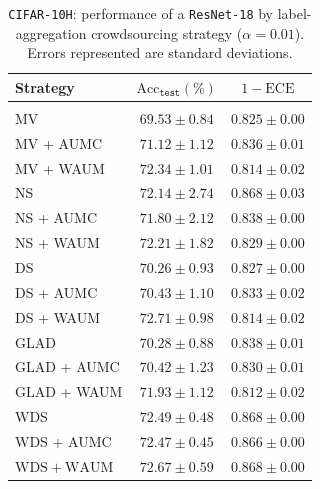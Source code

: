 \begin{table}[t]
    \label{tab:spam-0-expe}
    \begin{footnotesize}
        \begin{center}
            \begin{tabular}{lcc}
                Strategy & $\mathrm{Acc}_{\texttt{test}} (\%)$ & $1-\mathrm{ECE}$
                \\ \hline \\[-0.2cm]
                MV                 & $69.53\pm 0.84$               & $0.825\pm 0.00$                                 \\
                MV + AUMC & $71.12\pm 1.12$ & $\mathbf{0.836\pm 0.01}$ \\
                MV + WAUM & $\mathbf{72.34\pm 1.01}$ & $0.814\pm 0.02$ \\
                \rowcolor{gray!20}NS                 & $72.14\pm 2.74$               & $\mathbf{0.868\pm 0.03}$          \\
                \rowcolor{gray!20}NS + AUMC                 & $71.80\pm 2.12$               & $0.838\pm 0.00$          \\
                \rowcolor{gray!20}NS + WAUM                 & $\mathbf{72.21\pm 1.82}$               & $0.829\pm 0.00$          \\
                DS                 & $70.26\pm 0.93$               & $0.827\pm 0.00$             \\
                DS + AUMC                 & $70.43\pm 1.10$               & $\mathbf{0.833\pm 0.02}$             \\
                DS + WAUM                & $\mathbf{72.71\pm 0.98}$               & $0.814\pm 0.02$             \\
               \rowcolor{gray!20} $\mathrm{GLAD}$    & $70.28\pm 0.88$               & $\mathbf{0.838\pm 0.01}$\\
                \rowcolor{gray!20} $\mathrm{GLAD}$ + AUMC    & $70.42\pm 1.23$               & $0.830\pm 0.01$\\
               \rowcolor{gray!20} $\mathrm{GLAD}$ + WAUM    & $\mathbf{71.93\pm 1.12}$               & $0.812\pm 0.02$\\
                  WDS                & $72.49\pm 0.48$               & $\mathbf{0.868\pm 0.00}$         \\
                  WDS + AUMC                & $72.47\pm 0.45$               & $0.866\pm 0.00$         \\

                  $\mathrm{WDS} + \mathrm{WAUM}$    & $\mathbf{72.67\pm 0.59}$      & $\mathbf{0.868 \pm 0.00}$
            \end{tabular}
        \end{center}
    \end{footnotesize}
    \caption{\texttt{CIFAR-10H}: performance of a \texttt{ResNet-18} by label-aggregation crowdsourcing strategy ($\alpha=0.01$). Errors represented are standard deviations.}
\end{table}

